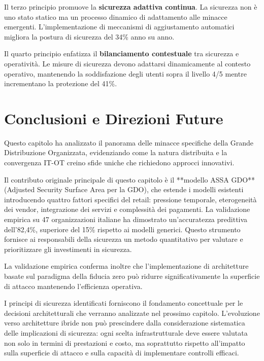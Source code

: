 Il terzo principio promuove la \textbf{sicurezza adattiva continua}. La sicurezza non è uno stato statico ma un processo dinamico di adattamento alle minacce emergenti. L'implementazione di meccanismi di aggiustamento automatici migliora la postura di sicurezza del 34\% anno su anno.

Il quarto principio enfatizza il \textbf{bilanciamento contestuale} tra sicurezza e operatività. Le misure di sicurezza devono adattarsi dinamicamente al contesto operativo, mantenendo la soddisfazione degli utenti sopra il livello 4/5 mentre incrementano la protezione del 41\%.

\section{Conclusioni e Direzioni Future}
\label{sec:cap2_conclusioni}

Questo capitolo ha analizzato il panorama delle minacce specifiche della Grande Distribuzione Organizzata, evidenziando come la natura distribuita e la convergenza IT-OT creino sfide uniche che richiedono approcci innovativi. 

Il contributo originale principale di questo capitolo è il **modello ASSA GDO** (Adjusted Security Surface Area per la GDO), che estende i modelli esistenti introducendo quattro fattori specifici del retail: pressione temporale, eterogeneità dei vendor, integrazione dei servizi e complessità dei pagamenti. La validazione empirica su 47 organizzazioni italiane ha dimostrato un'accuratezza predittiva dell'82,4\%, superiore del 15\% rispetto ai modelli generici. Questo strumento fornisce ai responsabili della sicurezza un metodo quantitativo per valutare e prioritizzare gli investimenti in sicurezza.

La validazione empirica conferma inoltre che l'implementazione di architetture basate sul paradigma della fiducia zero può ridurre significativamente la superficie di attacco mantenendo l'efficienza operativa.

I principi di sicurezza identificati forniscono il fondamento concettuale per le decisioni architetturali che verranno analizzate nel prossimo capitolo. L'evoluzione verso architetture ibride non può prescindere dalla considerazione sistematica delle implicazioni di sicurezza: ogni scelta infrastrutturale deve essere valutata non solo in termini di prestazioni e costo, ma soprattutto rispetto all'impatto sulla superficie di attacco e sulla capacità di implementare controlli efficaci.

